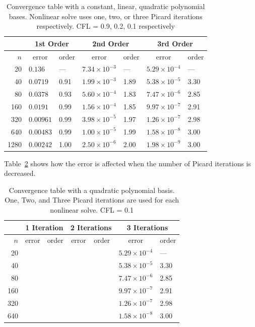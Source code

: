 \begin{table}
  \centering
  \begin{tabular}{r*{6}l}
    \toprule
    & \multicolumn{2}{c}{1st Order} & \multicolumn{2}{c}{2nd Order} & \multicolumn{2}{c}{3rd Order} \\
    \midrule
    \(n\) & \multicolumn{1}{c}{error} & order & \multicolumn{1}{c}{error} & order & \multicolumn{1}{c}{error} & order\\
    \midrule
      20 &   \(0.136\) &  --- & \(7.34 \times 10^{-3}\) &  --- & \(5.29 \times 10^{-4}\) &  --- \\
      40 &  \(0.0719\) & 0.91 & \(1.99 \times 10^{-3}\) & 1.89 & \(5.38 \times 10^{-5}\) & 3.30 \\
      80 &  \(0.0378\) & 0.93 & \(5.60 \times 10^{-4}\) & 1.83 & \(7.47 \times 10^{-6}\) & 2.85 \\
     160 &  \(0.0191\) & 0.99 & \(1.56 \times 10^{-4}\) & 1.85 & \(9.97 \times 10^{-7}\) & 2.91 \\
     320 & \(0.00961\) & 0.99 & \(3.98 \times 10^{-5}\) & 1.97 & \(1.26 \times 10^{-7}\) & 2.98 \\
     640 & \(0.00483\) & 0.99 & \(1.00 \times 10^{-5}\) & 1.99 & \(1.58 \times 10^{-8}\) & 3.00 \\
    1280 & \(0.00242\) & 1.00 & \(2.50 \times 10^{-6}\) & 2.00 & \(1.98 \times 10^{-9}\) & 3.00 \\
    \bottomrule
  \end{tabular}
  \caption{Convergence table with a constant, linear, quadratic polynomial bases.
  Nonlinear solve uses one, two, or three Picard iterations respectively.
   CFL = 0.9, 0.2, 0.1 respectively}\label{tab:convergence_results}
\end{table}

Table~\ref{tab:iteration_results} shows how the error is affected when the number of
Picard iterations is decreased.

\begin{table}
  \centering
  \begin{tabular}{r*{6}l}
    \toprule
         & \multicolumn{2}{c}{1 Iteration} & \multicolumn{2}{c}{2 Iterations} & \multicolumn{2}{c}{3 Iterations} \\
    \midrule
    \(n\)& \multicolumn{1}{c}{error} & order & \multicolumn{1}{c}{error} & order & \multicolumn{1}{c}{error} & order\\
    \midrule
      20 & & & & & \(5.29 \times 10^{-4}\) & --- \\
      40 & & & & & \(5.38 \times 10^{-5}\) & 3.30 \\
      80 & & & & & \(7.47 \times 10^{-6}\) & 2.85 \\
     160 & & & & & \(9.97 \times 10^{-7}\) & 2.91 \\
     320 & & & & & \(1.26 \times 10^{-7}\) & 2.98 \\
     640 & & & & & \(1.58 \times 10^{-8}\) & 3.00 \\
    \bottomrule
  \end{tabular}
  \caption{Convergence table with a quadratic polynomial basis. One, Two, and Three
  Picard iterations are used for each nonlinear solve. CFL = 0.1}\label{tab:iteration_results}
\end{table}

